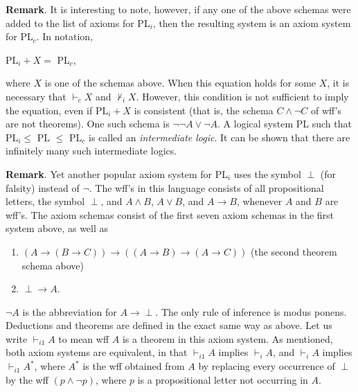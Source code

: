 \documentclass[12pt]{article}
\begin{document}
\textbf{Remark}.  It is interesting to note, however, if any one of the above schemas were added to the list of axioms for PL$_i$, then the resulting system is an axiom system for PL$_c$.  In notation, 
\begin{center}
PL$_i + X = $ PL$_c$,
\end{center}
where $X$ is one of the schemas above.  When this equation holds for some $X$, it is necessary that $\vdash_c X$ and $\not \vdash_i X$.  However, this condition is not sufficient to imply the equation, even if PL$_i +X$ is consistent (that is, the schema $C\land \neg C$ of wff's are not theorems).  One such schema is $\neg \neg A \lor \neg A$.  A logical system PL such that PL$_i \le $ PL $\le$ PL$_c$ is called an \emph{intermediate logic}.  It can be shown that there are infinitely many such intermediate logics.

\textbf{Remark}.  Yet another popular axiom system for PL$_i$ uses the symbol $\perp$ (for falsity) instead of $\neg$.  The wff's in this language consists of all propositional letters, the symbol $\perp$, and $A\land B$, $A\lor B$, and $A \to B$, whenever $A$ and $B$ are wff's.  The axiom schemas consist of the first seven axiom schemas in the first system above, as well as
\begin{enumerate}
\item $(A \to (B\to C)) \to ((A\to B)\to (A\to C))$ (the second theorem schema above)
\item $\perp \to A$.
\end{enumerate}
$\neg A$ is the abbreviation for $A \to \perp$.  The only rule of inference is modus ponens.  Deductions and theorems are defined in the exact same way as above.  Let us write $\vdash_{i1} A$ to mean wff $A$ is a theorem in this axiom system.  As mentioned, both axiom systems are equivalent, in that $\vdash_{i1} A$ implies $\vdash_i A$, and $\vdash_i A$ implies $\vdash_{i1} A^*$, where $A^*$ is the wff obtained from $A$ by replacing every occurrence of $\perp$ by the wff $(p\land \neg p)$, where $p$ is a propositional letter not occurring in $A$.

\end{document}
